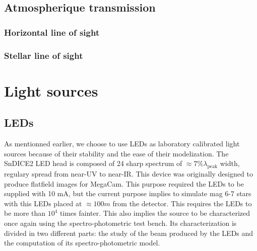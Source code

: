 \documentclass[\docopts]{\docclass}
\begin{document}
\subsection{Atmospherique transmission}
\label{sec:atmosphere}

\subsubsection{Horizontal line of sight}
\label{sec:hline}


\subsubsection{Stellar line of sight}
\label{sec:av}


\section{Light sources}
\label{sec:sources}

\subsection{LEDs}
\label{sec:leds}
As mentionned earlier, we choose to use LEDs as laboratory calibrated
light sources because of their stability and the ease of their
modelization. The SnDICE2 LED head is composed of 24 sharp spectrum of
$\approx 7\% \lambda_\text{peak}$ width, regulary spread from near-UV to
near-IR. This device was originally designed to produce flatfield
images for MegaCam. This purpose required the LEDs to be supplied with
10 mA, but the current purpose implies to simulate mag 6-7 stars with
this LEDs placed at $\approx 100 m$ from the detector. This requires
the LEDs to be more than $10^4$ times fainter. This also implies the
source to be characterized once again using the spectro-photometric
test bench. Its characterization is divided in two different parts:
the study of the beam produced by the LEDs and the computation of its
spectro-photometric model.
\end{document}
